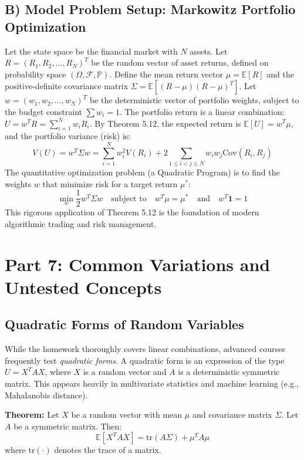 \documentclass[11pt, a4paper]{article}
\theoremstyle{definition}
\theoremstyle{remark}
\newcommand{\E}{\mathbb{E}}
\newcommand{\Prob}{\mathbb{P}}
\newcommand{\F}{\mathcal{F}}
\begin{document}
\subsection{B) Model Problem Setup: Markowitz Portfolio Optimization}
Let the state space be the financial market with $N$ assets. Let $R = (R_1, R_2, \dots, R_N)^T$ be the random vector of asset returns, defined on probability space $(\Omega, \F, \Prob)$.
Define the mean return vector $\mu = \E[R]$ and the positive-definite covariance matrix $\Sigma = \E[(R-\mu)(R-\mu)^T]$.
Let $w = (w_1, w_2, \dots, w_N)^T$ be the deterministic vector of portfolio weights, subject to the budget constraint $\sum w_i = 1$.
The portfolio return is a linear combination: $U = w^T R = \sum_{i=1}^N w_i R_i$.
By Theorem 5.12, the expected return is $\E[U] = w^T \mu$, and the portfolio variance (risk) is:
\[ V(U) = w^T \Sigma w = \sum_{i=1}^N w_i^2 V(R_i) + 2 \sum_{1 \le i < j \le N} w_i w_j \text{Cov}(R_i, R_j) \]
The quantitative optimization problem (a Quadratic Program) is to find the weights $w$ that minimize risk for a target return $\mu^*$:
\[ \min_{w} \frac{1}{2} w^T \Sigma w \quad \text{subject to} \quad w^T \mu = \mu^* \quad \text{and} \quad w^T \mathbf{1} = 1 \]
This rigorous application of Theorem 5.12 is the foundation of modern algorithmic trading and risk management.

\newpage
\section{Part 7: Common Variations and Untested Concepts}

\subsection{Quadratic Forms of Random Variables}
While the homework thoroughly covers linear combinations, advanced courses frequently test \textit{quadratic forms}. A quadratic form is an expression of the type $U = X^T A X$, where $X$ is a random vector and $A$ is a deterministic symmetric matrix. This appears heavily in multivariate statistics and machine learning (e.g., Mahalanobis distance).

\textbf{Theorem:} Let $X$ be a random vector with mean $\mu$ and covariance matrix $\Sigma$. Let $A$ be a symmetric matrix. Then:
\[ \E[X^T A X] = \text{tr}(A \Sigma) + \mu^T A \mu \]
where $\text{tr}(\cdot)$ denotes the trace of a matrix.
\end{document}
